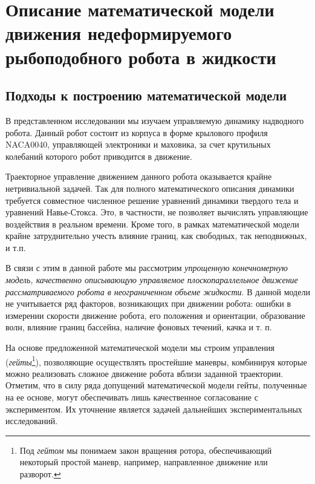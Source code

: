 \chapter{Описание математической модели движения недеформируемого рыбоподобного робота в жидкости}\label{ch:ch5}

\section{Подходы к построению математической модели}


В представленном исследовании мы изучаем управляемую динамику надводного робота. Данный робот состоит из корпуса в форме крылового профиля NACA0040, управляющей электроники и маховика, за счет крутильных колебаний которого робот приводится в движение. 

Траекторное управление движением данного робота оказывается крайне нетривиальной задачей. Так для полного математического описания динамики требуется совместное численное решение уравнений динамики твердого тела и уравнений Навье-Стокса. Это, в частности, не позволяет вычислять управляющие воздействия в реальном времени. Кроме того, в рамках математической модели крайне затруднительно учесть влияние границ, как свободных, так неподвижных, и т.п.

В связи с этим в данной работе мы рассмотрим \textit{упрощенную конечномерную модель, качественно описывающую управляемое плоскопараллельное движение рассматриваемого робота в неограниченном объеме жидкости}. В данной модели не учитывается ряд факторов, возникающих при движении робота: ошибки в измерении скорости движение робота, его положения и ориентации, образование волн, влияние границ бассейна, наличие фоновых течений, качка и т. п.

На основе предложенной математической модели мы строим управления (\textit{гейты}\footnote{Под \textit{гейтом} мы понимаем закон вращения ротора, обеспечивающий некоторый простой маневр, например, направленное движение или разворот.}), позволяющие осуществлять простейшие маневры, комбинируя которые можно реализовать сложное движение робота вблизи заданной траектории. Отметим, что в силу ряда допущений математической модели гейты, полученные на ее основе, могут обеспечивать лишь качественное согласование с экспериментом. Их уточнение является задачей дальнейших экспериментальных исследований.

